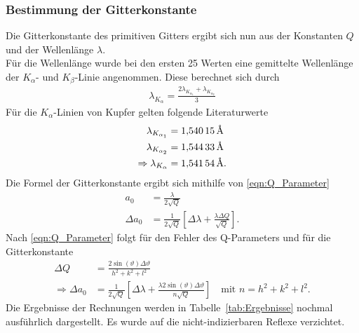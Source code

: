 \documentclass[a4paper,twoside,final]{article}
\begin{document}
\subsubsection{Bestimmung der Gitterkonstante}
Die Gitterkonstante des primitiven Gitters ergibt sich nun aus der Konstanten $Q$ und der Wellenlänge $\lambda$.\\
Für die Wellenlänge wurde bei den ersten 25 Werten eine gemittelte Wellenlänge der $K_\alpha$- und $K_\beta$-Linie angenommen. Diese berechnet sich durch
\begin{align}
  \lambda_{K_\alpha} = \frac{2\lambda_{K_{\alpha_1}}+\lambda_{K_{\alpha_2}}}{3}
\end{align}
Für die $K_\alpha$-Linien von Kupfer gelten folgende Literaturwerte
\begin{align}
  \lambda_{K_{\alpha_1}} &= \SI{1,54015}{\textup{\AA}}\nonumber\\
  \lambda_{K_{\alpha_2}} &= \SI{1,54433}{\textup{\AA}}\\
\Rightarrow \lambda_{K_\alpha} &= \SI{1,54154}{\textup{\AA}}.\nonumber
\end{align}
Die Formel der Gitterkonstante ergibt sich mithilfe von \eqref{eqn:Q_Parameter}
\begin{align}
  a_0 &= \frac{\lambda}{2 \sqrt{Q}}\\
  \Delta a_0 &= \frac{1}{2\sqrt{Q}} \left[\Delta \lambda + \frac{\lambda \Delta Q}{\sqrt{Q}}\right].
\end{align}
Nach \eqref{eqn:Q_Parameter} folgt für den Fehler des Q-Parameters und für die Gitterkonstante
\begin{align}
  \Delta Q &= \frac{2 \sin(\vartheta)\Delta \vartheta}{h^2+k^2+l^2}\\
  \Rightarrow \Delta a_0 &= \frac{1}{2\sqrt{Q}} \left[\Delta \lambda + \frac{\lambda 2 \sin(\vartheta)\Delta \vartheta}{n\sqrt{Q}}\right] \quad \text{mit }n = h^2+k^2+l^2.
\end{align}
Die Ergebnisse der Rechnungen werden in Tabelle~\ref{tab:Ergebnisse} nochmal ausführlich dargestellt. Es wurde auf die nicht-indizierbaren Reflexe verzichtet.
\end{document}
